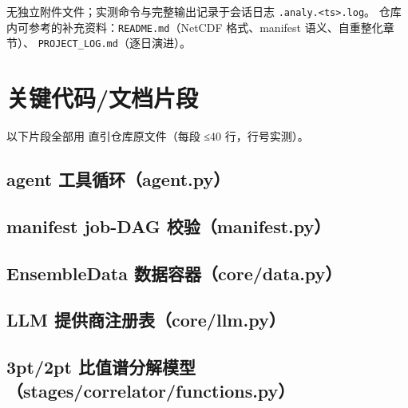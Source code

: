 \documentclass[UTF8]{ctexart}
\begin{document}
无独立附件文件；实测命令与完整输出记录于会话日志 \texttt{.analy.\textless ts\textgreater.log}。
仓库内可参考的补充资料：\texttt{README.md}（NetCDF 格式、manifest 语义、自重整化章节）、
\texttt{PROJECT\_LOG.md}（逐日演进）。

\section{关键代码/文档片段}

以下片段全部用 \lstinline|| 直引仓库原文件（每段 ≤40 行，行号实测）。

\subsection{agent 工具循环（agent.py）}



\subsection{manifest job-DAG 校验（manifest.py）}



\subsection{EnsembleData 数据容器（core/data.py）}



\subsection{LLM 提供商注册表（core/llm.py）}



\subsection{3pt/2pt 比值谱分解模型（stages/correlator/functions.py）}


\end{document}
